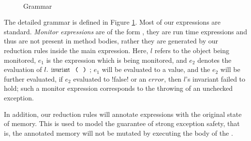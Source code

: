 \begin{figure}
\begin{grammatica}
		
		\\
		\\
		\\
		\\
		\\
		\\
	\end{grammatica}
	\caption{Grammar}\label{f:grammar}
\end{figure}


The detailed grammar is defined in Figure \ref{f:grammar}. 
Most of our expressions are standard.
\emph{Monitor expressions}
 are of the form , they 
are run time expressions and thus are not present in method bodies, rather they are generated by our reduction rules inside the main expression. Here, $l$ refers to the object being monitored, $e_1$ is the expression which is being monitored, and $e_2$ denotes the evaluation of $l.\invariant$; $e_1$ will be evaluated to a value, and the $e_2$ will be further evaluated, if $e_2$ evaluated to \Q!false! or an $\mathit{error}$, then $l$'s invariant failed to hold; such a monitor expression corresponds to the throwing of an unchecked exception.

In addition, our reduction rules will annotate \Q@try@ expressions with
the original state of memory. This is used to model the guarantee of strong exception safety, that is, the annotated memory will not be mutated by executing the body of the \Q@try@.

